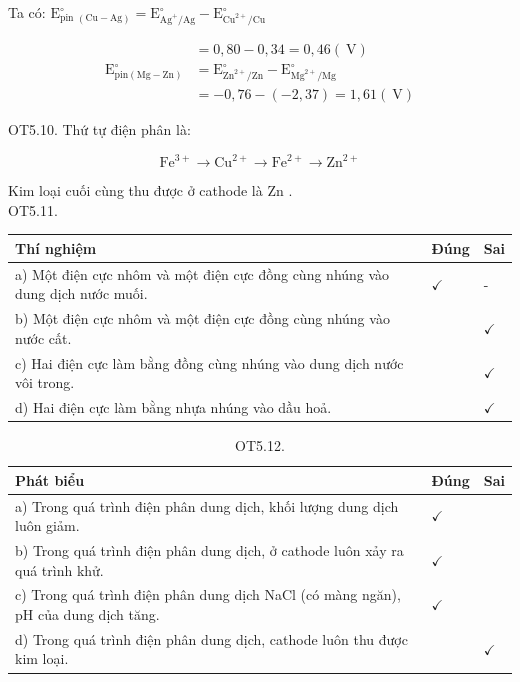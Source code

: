 \documentclass[10pt]{article}
\begin{document}
Ta có: $\mathrm{E}_{\text {pin }(\mathrm{Cu}-\mathrm{Ag})}^{\circ}=\mathrm{E}_{\mathrm{Ag}^{+} / \mathrm{Ag}}^{\circ}-\mathrm{E}_{\mathrm{Cu}^{2+} / \mathrm{Cu}}^{\circ}$

$$
\begin{aligned}
& =0,80-0,34=0,46(\mathrm{~V}) \\
\mathrm{E}_{\mathrm{pin}(\mathrm{Mg}-\mathrm{Zn})}^{\circ} & =\mathrm{E}_{\mathrm{Zn}^{2+} / \mathrm{Zn}}^{\circ}-\mathrm{E}_{\mathrm{Mg}^{2+} / \mathrm{Mg}}^{\circ} \\
& =-0,76-(-2,37)=1,61(\mathrm{~V})
\end{aligned}
$$

OT5.10. Thứ tự điện phân là:

$$
\mathrm{Fe}^{3+} \rightarrow \mathrm{Cu}^{2+} \rightarrow \mathrm{Fe}^{2+} \rightarrow \mathrm{Zn}^{2+}
$$

Kim loại cuối cùng thu được ở cathode là Zn .\\
OT5.11.

\begin{center}
\begin{tabular}{|l|l|l|}
\hline
Thí nghiệm & Đúng & Sai \\
\hline
a) Một điện cực nhôm và một điện cực đồng cùng nhúng vào dung dịch nước muối. & $\checkmark$ & - \\
\hline
b) Một điện cực nhôm và một điện cực đồng cùng nhúng vào nước cất. &  & $\checkmark$ \\
\hline
c) Hai điện cực làm bằng đồng cùng nhúng vào dung dịch nước vôi trong. &  & $\checkmark$ \\
\hline
d) Hai điện cực làm bằng nhựa nhúng vào dầu hoả. &  & $\checkmark$ \\
\hline
\end{tabular}
\end{center}

\begin{table}[h]
\begin{center}
\captionsetup{labelformat=empty}
\caption{OT5.12.}
\begin{tabular}{|l|l|l|}
\hline
Phát biểu & Đúng & Sai \\
\hline
a) Trong quá trình điện phân dung dịch, khối lượng dung dịch luôn giảm. & $\checkmark$ &  \\
\hline
b) Trong quá trình điện phân dung dịch, ở cathode luôn xảy ra quá trình khử. & $\checkmark$ &  \\
\hline
c) Trong quá trình điện phân dung dịch NaCl (có màng ngăn), pH của dung dịch tăng. & $\checkmark$ &  \\
\hline
d) Trong quá trình điện phân dung dịch, cathode luôn thu được kim loại. &  & $\checkmark$ \\
\hline
\end{tabular}
\end{center}
\end{table}
\end{document}
